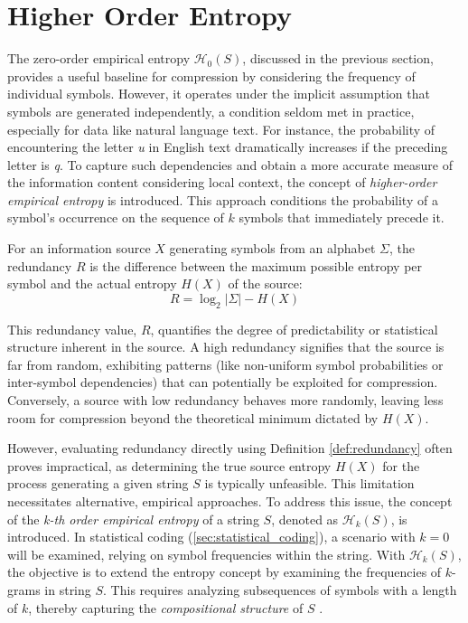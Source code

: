 \section{Higher Order Entropy} \label{sec:higher_order_entropy}

\noindent The zero-order empirical entropy $\mathcal{H}_0(S)$, discussed in the previous section, provides a useful baseline for compression by considering the frequency of individual symbols. However, it operates under the implicit assumption that symbols are generated independently, a condition seldom met in practice, especially for data like natural language text. For instance, the probability of encountering the letter \emph{u} in English text dramatically increases if the preceding letter is \emph{q}. To capture such dependencies and obtain a more accurate measure of the information content considering local context, the concept of \emph{higher-order empirical entropy} is introduced. This approach conditions the probability of a symbol's occurrence on the sequence of $k$ symbols that immediately precede it.

\begin{definition}[Redundancy] \label{def:redundancy}
    For an information source $X$ generating symbols from an alphabet $\Sigma$, the redundancy $R$ is the difference between the maximum possible entropy per symbol and the actual entropy $H(X)$ of the source:
    \begin{equation*}
        R = \log_2 |\Sigma| - H(X)
    \end{equation*}
\end{definition}

\noindent This redundancy value, $R$, quantifies the degree of predictability or statistical structure inherent in the source. A high redundancy signifies that the source is far from random, exhibiting patterns (like non-uniform symbol probabilities or inter-symbol dependencies) that can potentially be exploited for compression. Conversely, a source with low redundancy behaves more randomly, leaving less room for compression beyond the theoretical minimum dictated by $H(X)$.

\noindent However, evaluating redundancy directly using Definition \ref{def:redundancy} often proves impractical, as determining the true source entropy $H(X)$ for the process generating a given string $S$ is typically unfeasible. This limitation necessitates alternative, empirical approaches. To address this issue, the concept of the \emph{k-th order empirical entropy} of a string $S$, denoted as $\mathcal{H}_k(S)$, is introduced. In statistical coding (\autoref{sec:statistical_coding}), a scenario with $k=0$ will be examined, relying on symbol frequencies within the string. With $\mathcal{H}_k(S)$, the objective is to extend the entropy concept by examining the frequencies of $k$-grams in string $S$. This requires analyzing subsequences of symbols with a length of $k$, thereby capturing the \emph{compositional structure} of $S$ \cite{ferragina2023pearls}.

